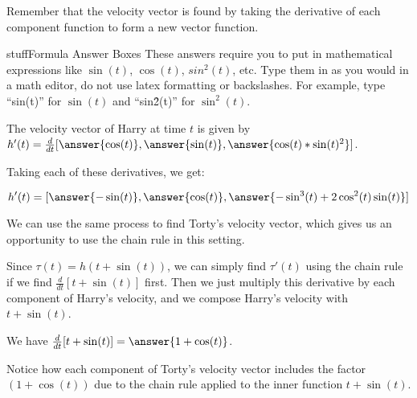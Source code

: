 \documentclass{ximera}
\begin{document}
\begin{problem}
    Remember that the velocity vector is found by taking the derivative of each component function to form a new vector function. 
    
    \begin{expandable}{stuff}{Formula Answer Boxes}
        These answers require you to put in mathematical expressions like $\sin(t)$, $\cos(t)$, $sin^2(t)$, etc. Type them in as you would in a math editor, do not use latex formatting or backslashes. For example, type ``sin(t)'' for $\sin(t)$ and ``sin\^2(t)'' for $\sin^2(t)$.
    \end{expandable}

    The velocity vector of Harry at time $t$ is given by $h'(t)=\frac{d}{dt}[ \answer{\cos(t)}, \answer{\sin(t)}, \answer{\cos(t)*\sin(t)^2}]$.
    
    Taking each of these derivatives, we get:

    \[h'(t)=[ \answer{-\sin(t)}, \answer{\cos(t)}, \answer{-\sin^3(t)+2\cos^2(t)\sin(t)}]\]
\end{problem}

We can use the same process to find Torty's velocity vector, which gives us an opportunity to use the chain rule in this setting.

\begin{problem}
    Since $\tau(t)=h(t+\sin(t))$, we can simply find $\tau'(t)$ using the chain rule if we find $\frac{d}{dt}[t+\sin(t)]$ first. Then we just multiply this derivative by each component of Harry's velocity, and we compose Harry's velocity with $t+\sin(t)$.

    We have $\frac{d}{dt}[t+\sin(t)]=\answer{1+\cos(t)}$.
    
    \begin{feedback}
        Notice how each component of Torty's velocity vector includes the factor $(1+\cos(t))$ due to the chain rule applied to the inner function $t+\sin(t)$.
    \end{feedback}

\end{problem}
\end{document}

